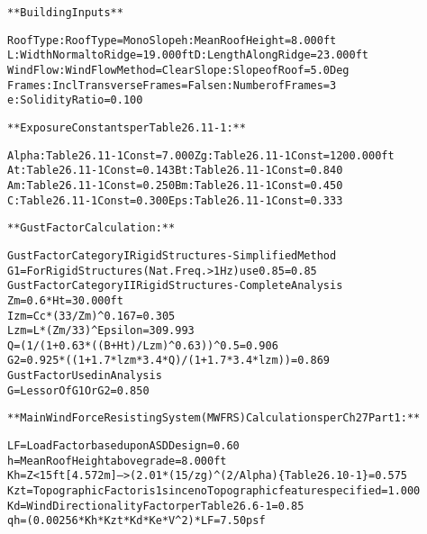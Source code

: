 \documentclass[12pt,notitle,letterpaper]{report}
\renewenvironment{quote}
  {\small\list{}{\rightmargin=0cm \leftmargin=0cm}%
   \item\relax}
  {\endlist}
\begin{document}
\begin{quote}
\begin{alltt}
**Building Inputs**

    RoofType: Roof Type          = MonoSlope       h       : Mean Roof Height   = 8.000 ft
    L       : Width Normal to Ridge= 19.000 ft     D       : Length Along Ridge = 23.000 ft
    WindFlow: Wind Flow Method   = Clear           Slope   : Slope of Roof      = 5.0 Deg
    Frames  : Incl Transverse Frames= False        n       : Number of Frames   = 3
    e       : Solidity Ratio     = 0.100



**Exposure Constants per Table 26.11-1:**

    Alpha: Table 26.11-1 Const   = 7.000           Zg:    Table 26.11-1 Const   = 1200.000 ft
    At:    Table 26.11-1 Const   = 0.143           Bt:    Table 26.11-1 Const   = 0.840
    Am:    Table 26.11-1 Const   = 0.250           Bm:    Table 26.11-1 Const   = 0.450
    C:     Table 26.11-1 Const   = 0.300           Eps:   Table 26.11-1 Const   = 0.333



**Gust Factor Calculation:**

    Gust Factor Category I Rigid Structures - Simplified Method
    G1        = For Rigid Structures (Nat. Freq.>1 Hz) use 0.85                 = 0.85
    Gust Factor Category II Rigid Structures - Complete Analysis
    Zm        = 0.6 * Ht                                                        = 30.000 ft
    Izm       = Cc * (33 / Zm) ^ 0.167                                          = 0.305
    Lzm       = L * (Zm / 33) ^ Epsilon                                         = 309.993
    Q         = (1 / (1 + 0.63 * ((B + Ht) / Lzm)^0.63))^0.5                    = 0.906
    G2        = 0.925*((1+1.7*lzm*3.4*Q)/(1+1.7*3.4*lzm))                       = 0.869
    Gust Factor Used in Analysis
    G         = Lessor Of G1 Or G2                                              = 0.850



**Main Wind Force Resisting System (MWFRS) Calculations per Ch 27 Part 1:**

    LF        = Load Factor based upon ASD Design                               = 0.60
    h         = Mean Roof Height above grade                                    = 8.000 ft
    Kh        = Z < 15 ft [4.572 m]--> (2.01 * (15/zg)^(2/Alpha) \{Table 26.10-1\}= 0.575
    Kzt       = Topographic Factor is 1 since no Topographic feature specified  = 1.000
    Kd        = Wind Directionality Factor per Table 26.6-1                     = 0.85
    qh        = (0.00256 * Kh * Kzt * Kd * Ke * V^2) * LF                       = 7.50 psf




\end{alltt}
\end{quote}
\end{document}
